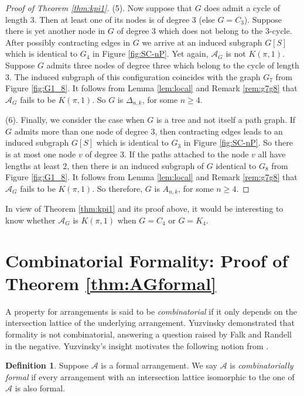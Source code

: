 \documentclass[12pt]{amsart}
\newcommand\CA{{\mathscr A}}
\numberwithin{equation}{section}
\theoremstyle{plain}
\theoremstyle{definition}
\newtheorem{defn}[equation]{Definition}
\begin{document}
\begin{proof}[Proof of Theorem \ref{thm:kpi1}]
	(5). Now suppose that $G$ does admit a cycle of length $3$. Then at least one of its nodes  is of degree $3$ (else $G = C_3$). Suppose there is yet another node in $G$ of degree $3$ which does not belong to the 3-cycle. After possibly contracting edges in $G$ we arrive at an induced subgraph $G[S]$ which is identical to $G_4$ in
	Figure \ref{fig:SC-nP}.
	Yet again, $\CA_G$ is not $K(\pi,1)$. 
 Suppose $G$ admits three nodes of degree three which belong to the cycle of length $3$. The induced subgraph of this configuration coincides with the graph $G_7$ from Figure \ref{fig:G1_8}. It follows from Lemma \ref{lem:local} and Remark \ref{rem:g7g8} that 
 $\CA_G$ fails to be $K(\pi,1)$. 
 So $G$ is $\Delta_{n,k}$, for some $n\ge4$.

	(6). Finally, we consider the case when $G$ is a tree and not itself a path graph. If $G$ admits more than one node of degree $3$, then contracting edges leads to an induced subgraph $G[S]$ which is identical to $G_3$ in
	Figure \ref{fig:SC-nP}. So there is at most one node $v$ of degree $3$. If the paths attached to the node $v$ all have lengths at least $2$, then there is an induced subgraph of $G$ identical to $G_8$ from Figure \ref{fig:G1_8}. It follows from Lemma \ref{lem:local} and Remark \ref{rem:g7g8} that 
 $\CA_G$ fails to be $K(\pi,1)$. 
 So therefore, $G$ is $A_{n,k}$, for some $n\ge4$.
\end{proof}

In view of Theorem \ref{thm:kpi1} and its proof above, 
it would be interesting to know whether $\CA_G$ is $K(\pi,1)$ when $G = C_4$ or $G = K_4$.



\section{Combinatorial Formality: Proof of Theorem \ref{thm:AGformal}}
\label{s:thm:AGformal}

A property for arrangements is said to be \emph{combinatorial} if it only depends on the intersection lattice of the underlying arrangement.
Yuzvinsky \cite[Ex.~2.2]{yuzvinsky:obstruction} demonstrated that formality is not combinatorial, answering a question raised by Falk and Randell \cite{falkrandell:homotopy} in the negative.
Yuzvinsky's insight motivates the following notion from \cite{moellermueckschroehre:formal}.

\begin{defn}
	\label{def:combformal}
	Suppose $\CA$ is a formal arrangement. We say $\CA$ is \emph{combinatorially formal} if every arrangement with 
	an intersection lattice isomorphic to the one of
	$\CA$ is also formal.
\end{defn}
\end{document}
